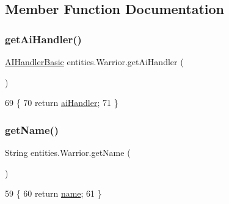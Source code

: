 \subsection{Member Function Documentation}
\mbox{\label{classentities_1_1_warrior_a20baa7b8b0b22cb20f4dc996e6a0b43e}} 
\subsubsection{\texorpdfstring{get\+Ai\+Handler()}{getAiHandler()}}
{\footnotesize\ttfamily \mbox{\hyperlink{classentities_1_1_a_i_handler_basic}{A\+I\+Handler\+Basic}} entities.\+Warrior.\+get\+Ai\+Handler (\begin{DoxyParamCaption}{ }\end{DoxyParamCaption})\hspace{0.3cm}{\ttfamily [inline]}}


\begin{DoxyCode}
69                                          \{
70         \textcolor{keywordflow}{return} \mbox{\hyperlink{classentities_1_1_warrior_a5192a845694a855efc603e4e89d6df38}{aiHandler}};
71     \}
\end{DoxyCode}
\mbox{\label{classentities_1_1_warrior_ab2cfa037b8077913f266df893d83e60b}} 
\subsubsection{\texorpdfstring{get\+Name()}{getName()}}
{\footnotesize\ttfamily String entities.\+Warrior.\+get\+Name (\begin{DoxyParamCaption}{ }\end{DoxyParamCaption})\hspace{0.3cm}{\ttfamily [inline]}}


\begin{DoxyCode}
59                             \{
60         \textcolor{keywordflow}{return} \mbox{\hyperlink{classentities_1_1_warrior_a1fab32d35334023bc7cd4866841e817b}{name}};
61     \}
\end{DoxyCode}
\mbox{\label{classentities_1_1_warrior_a5b1865118c28ac6acc320021e6d89917}} 
